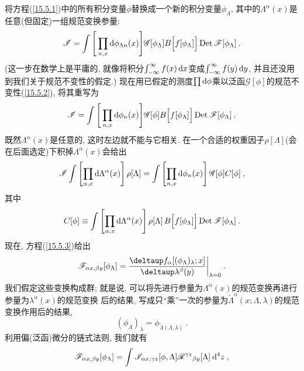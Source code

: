  将方程(\ref{15.5.1})中的所有积分变量$\phi $替换成一个新的积分变量$\phi _{\Lambda }$,
其中的$\Lambda ^{\alpha }(x)$是任意(但固定)一组规范变换参量:%
\begin{equation}
\mathscr{I} = \int \Bigg[ \prod_{n,x} \mathrm{d}\phi_{\Lambda n}(x)\Bigg] \mathscr{G}[\phi_{\Lambda}] B\Big[f[\phi_{\Lambda}]\Big] \operatorname{Det} \mathscr{F} [\phi_{\Lambda}]\:.  \label{15.5.8}
\end{equation}
(这一步在数学上是平庸的, 就像将积分$\int_{-\infty}^{\infty }f(x)\,\mathrm{d} x$变成$\int_{-\infty }^{\infty }f(y)\,\mathrm{d} y$, 
并且还没用到我们关于规范不变性的假定.) 现在用已假定的测度$\prod\mathrm{d}\phi $乘以泛函$\mathscr{G}[ \phi ]$的规范不变性(\ref{15.5.2}), 将其重写为
\begin{equation}
\mathscr{I} = \int \Bigg[ \prod_{n,x} \mathrm{d}\phi_{n}(x)\Bigg] \mathscr{G}[\phi] B\Big[f[\phi_{\Lambda}]\Big] \operatorname{Det} \mathscr{F} [\phi_{\Lambda}]\:.  \label{15.5.9}
\end{equation}
既然$\Lambda ^{\alpha }(x)$是任意的, 这时左边就不能与它相关. 
在一个合适的权重因子$\rho [ \Lambda ]$(会在后面选定)下积掉$\Lambda ^{\alpha}(x)$会给出
\begin{equation}
\mathscr{I}\int \left[ \prod_{\alpha ,x}\dif\Lambda ^{\alpha }(x)\right] \rho
[ \Lambda ]=\int \left[ \prod_{n,x}\dif\phi _{n}(x)\right] \mathscr{G}%
[ \phi ]C[\phi ]\:,   \label{15.5.10}
\end{equation}%
其中\begin{equation}
C[\phi ]\equiv \int \left[ \prod_{\alpha ,x}\dif\Lambda ^{\alpha }(x)\right]
\rho [ \Lambda ]\,B\Big[ f[\phi _{\Lambda }]\Big] \operatorname{Det} \mathscr{F}%
[ \phi _{\Lambda }]\:.   \label{15.5.11}
\end{equation}
现在, 方程(\ref{15.5.3})给出\begin{equation}
\mathscr{F}_{\alpha x,\beta y}[\phi_{\Lambda}]= \frac{\deltaup f_{\alpha }[(\phi
_{\Lambda })_{\lambda };x]}{\deltaup \lambda ^{\beta }(y)}\biggr\vert
_{\lambda =0}\:.   \label{15.5.12}
\end{equation}%
我们假定这些变换构成群; 就是说, 可以将先进行参量为$\Lambda ^{\alpha }(x)$的规范变换再进行参量为$\lambda ^{\alpha }(x)$的规范变换%
后的结果, 写成只``乘''一次的参量为$\tilde{\Lambda}^{\alpha }(x;\Lambda,\lambda )$的规范变换作用后的结果,%
\begin{equation}
(\phi _{\Lambda })_{\lambda }=\phi _{\tilde{\Lambda}(\Lambda ,\lambda )}\:.   \label{15.5.13}
\end{equation}%
利用偏(泛函)微分的链式法则, 我们就有\begin{equation}
\mathscr{F}_{\alpha x,\beta y}[\phi _{\Lambda }]=\int \mathscr{I}_{\alpha
x,\gamma z}[\phi ,\Lambda ]\mathscr{R}^{\gamma z}{}_{\beta y}[ \Lambda] \:\mathrm{d}^{4}z\:,   \label{15.5.14}
\end{equation}%
